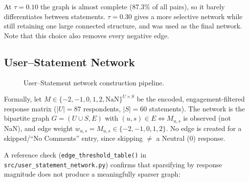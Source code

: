 \documentclass[11pt]{article}
\begin{document}
At $\tau = 0.10$ the graph is almost complete (87.3\% of all pairs), so it barely
differentiates between statements. $\tau = 0.30$ gives a more selective network while still
retaining one large connected structure, and was used as the final network. Note that this
choice also removes every negative edge.

\subsection{User--Statement Network}

\begin{figure}[H]
\centering
{}
\caption{User--Statement network construction pipeline.}
\label{fig:pipeline-flow}
\end{figure}

Formally, let $M \in \{-2,-1,0,1,2,\mathrm{NaN}\}^{U \times S}$ be the encoded, engagement-filtered
response matrix ($|U|{=}87$ respondents, $|S|{=}60$ statements). The network is the bipartite graph
$G=(U \cup S, E)$ with $(u,s) \in E \iff M_{u,s}$ is observed (not NaN), and edge weight
$w_{u,s} = M_{u,s} \in \{-2,-1,0,1,2\}$. No edge is created for a skipped/``No Comments'' entry, since
skipping $\neq$ a Neutral (0) response.

A reference check (\texttt{edge\_threshold\_table()} in \texttt{src/user\_statement\_network.py})
confirms that sparsifying by response magnitude does not produce a meaningfully sparser graph:
\end{document}
